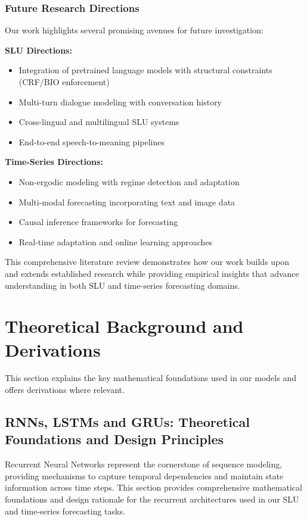 \documentclass[conference]{IEEEtran}
\begin{document}
\subsubsection{Future Research Directions}
Our work highlights several promising avenues for future investigation:

\textbf{SLU Directions:}
\begin{itemize}
  \item Integration of pretrained language models with structural constraints (CRF/BIO enforcement)
  \item Multi-turn dialogue modeling with conversation history
  \item Cross-lingual and multilingual SLU systems
  \item End-to-end speech-to-meaning pipelines
\end{itemize}

\textbf{Time-Series Directions:}
\begin{itemize}
  \item Non-ergodic modeling with regime detection and adaptation
  \item Multi-modal forecasting incorporating text and image data
  \item Causal inference frameworks for forecasting
  \item Real-time adaptation and online learning approaches
\end{itemize}

This comprehensive literature review demonstrates how our work builds upon and extends established research while providing empirical insights that advance understanding in both SLU and time-series forecasting domains.

\section{Theoretical Background and Derivations}
This section explains the key mathematical foundations used in our models and offers derivations where relevant.

\subsection{RNNs, LSTMs and GRUs: Theoretical Foundations and Design Principles}

Recurrent Neural Networks represent the cornerstone of sequence modeling, providing mechanisms to capture temporal dependencies and maintain state information across time steps. This section provides comprehensive mathematical foundations and design rationale for the recurrent architectures used in our SLU and time-series forecasting tasks.
\end{document}
